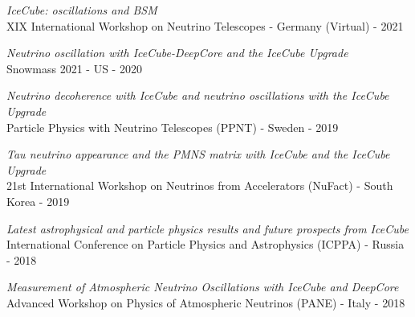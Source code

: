 \documentclass[a4paper,11pt]{article}
\begin{document}
 {\it IceCube: oscillations and BSM} \\ 
 XIX International Workshop on Neutrino Telescopes - Germany (Virtual) - 2021
 
{\it Neutrino oscillation with IceCube-DeepCore and the IceCube Upgrade} \\ 
 Snowmass 2021 - US - 2020
 
{\it Neutrino decoherence with IceCube and neutrino oscillations with the IceCube Upgrade} \\ 
 Particle Physics with Neutrino Telescopes (PPNT) - Sweden - 2019
 
{\it Tau neutrino appearance and the PMNS matrix with IceCube and the IceCube Upgrade} \\ 
 21st International Workshop on Neutrinos from Accelerators (NuFact) - South Korea - 2019


{\it Latest astrophysical and particle physics results and future prospects from IceCube} \\ 
 International Conference on Particle Physics and Astrophysics (ICPPA) - Russia - 2018

{\it Measurement of Atmospheric Neutrino Oscillations with IceCube and DeepCore} \\ 
 Advanced Workshop on Physics of Atmospheric Neutrinos (PANE) - Italy - 2018
 
 
\end{document}
